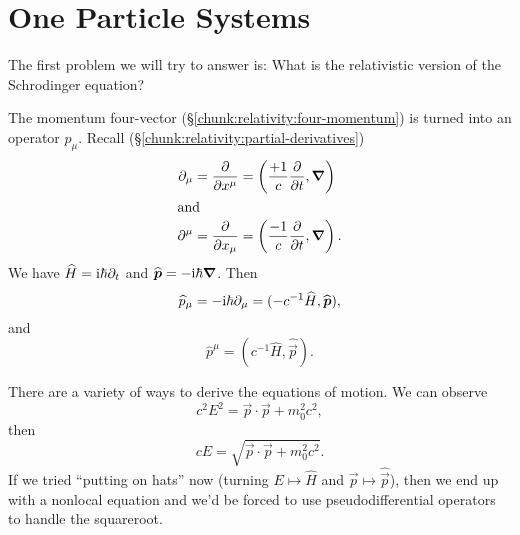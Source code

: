 \section{One Particle Systems}

\M
The first problem we will try to answer is: What is the relativistic
version of the Schrodinger equation?

The momentum four-vector (\S\ref{chunk:relativity:four-momentum}) is
turned into an operator $\widehat{p}_{\mu}$. Recall
(\S\ref{chunk:relativity:partial-derivatives}) 
\begin{subequations}
\begin{align}
\partial_{\mu} &= \frac{\partial}{\partial x^{\mu}} = \left(\frac{+1}{c}\frac{\partial}{\partial
t},\vec{\nabla}\right)\\
\intertext{and}
\partial^{\mu} &= \frac{\partial}{\partial x_{\mu}} = \left(\frac{-1}{c}\frac{\partial}{\partial
t},\vec{\nabla}\right).
\end{align}
\end{subequations}
We have $\widehat{H}=\I\hbar\partial_{t}$ and $\widehat{\vec{p}}=-\I\hbar\vec{\nabla}$.
Then
\begin{equation}
\widehat{p}_{\mu}=-\I\hbar\partial_{\mu} = (-c^{-1}\widehat{H},\widehat{\vec{p}}),
\end{equation}
and
\begin{equation}
\widehat{p}^{\mu} = (c^{-1}\widehat{H},\widehat{\vec{p}}).
\end{equation}

There are a variety of ways to derive the equations of motion. We can
observe
\begin{equation}
c^{2}E^{2} = \vec{p}\cdot\vec{p} + m_{0}^{2}c^{2},
\end{equation}
then
\begin{equation}
cE = \sqrt{\vec{p}\cdot\vec{p} + m_{0}^{2}c^{2}}.
\end{equation}
If we tried ``putting on hats'' now (turning $E\mapsto\widehat{H}$ and
$\vec{p}\mapsto\widehat{\vec{p}}$), then we end up with a nonlocal equation
and we'd be forced to use pseudodifferential operators to handle the
squareroot.

